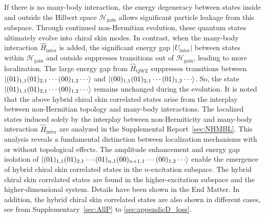\documentclass[longbibliography, aps, prx, amsmath, amssymb, amsfonts, twocolumn,superscriptaddress, footinbib]{revtex4-1}
\begin{document}
    If there is no many-body interaction, the energy degeneracy between states inside and outside the Hilbert space $\mathscr{H}_{\text{gain}}$ allows significant particle leakage from this subspace.
	Through continued non-Hermitian evolution, these quantum states ultimately evolve into chiral skin modes.
	In contrast, when the many-body interaction $\hat{H}_{\text{inter}}$ is added, the significant energy gap $\vert U_{\text{inter}} \vert$ between states within $\mathscr{H}_{\text{gain}}$ and outside suppresses transitions out of $\mathscr{H}_{\text{gain}}$, leading to more localization. 
	The large energy gap from $\hat{H}_{\text{QWZ}}$ suppresses transitions between $\ket{(01)_{1,1}(01)_{2,1}\cdots(00)_{1,2}\cdots}$ and $\ket{(00)_{1,1}(01)_{2,1}\cdots(01)_{1,2}\cdots}$. 
	So, the state $\ket{(01)_{1,1}(01)_{2,1}\cdots(00)_{1,2}\cdots}$ remains unchanged during the evolution.
    It is noted that the above hybrid chiral skin correlated states arise from the interplay between non-Hermitian topology and many-body interactions. The localized states induced solely by the interplay between non-Hermiticity and many-body interaction $\hat{H}_{\text{inter}}$ are analyzed in the Supplemental Report~\ref{sec:NHMBL}.
	This analysis reveals a fundamental distinction between localization mechanisms with or without topological effects.
    The amplitude enhancement and energy gap isolation of $\ket{(01)_{1,1}(01)_{2,1}\cdots(01)_{n,1}(00)_{n+1,1}\cdots(00)_{1,2}\cdots}$ enable the emergence of hybrid chiral skin correlated states in the $n$-excitation subspace. 
	The hybrid chiral skin correlated states are found in the higher-excitation subspace and the higher-dimensional system. Details have been shown in the End Matter.
    In addition, the hybrid chiral skin correlated states are also shown in different cases, see from Supplementary~\ref{sec:AllP} to \ref{sec:appendicD_loss}.
	
\end{document}
